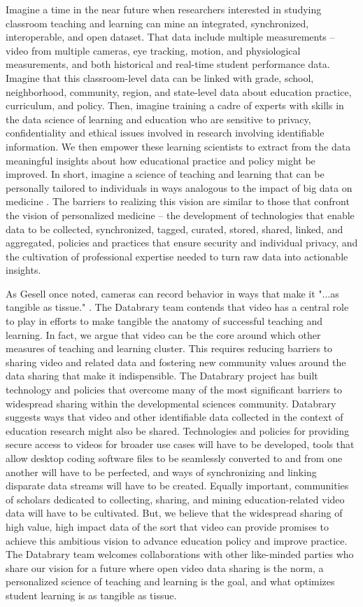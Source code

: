 \documentclass[letterpaper,man,apacite]{apa6}
\begin{document}
Imagine a time in the near future when researchers interested in studying classroom teaching and learning can mine an integrated, synchronized, interoperable, and open dataset.
That data include multiple measurements -- video from multiple cameras, eye tracking, motion, and physiological measurements, and both historical and real-time student performance data.
Imagine that this classroom-level data can be linked with grade, school, neighborhood, community, region, and state-level data about education practice, curriculum, and policy.
Then, imagine training a cadre of experts with skills in the data science of learning and education who are sensitive to privacy, confidentiality and ethical issues involved in research involving identifiable information.
We then empower these learning scientists to extract from the data meaningful insights about how educational practice and policy might be improved.
In short, imagine a science of teaching and learning that can be personally tailored to individuals in ways analogous to the impact of big data on medicine \cite{BBC2014}.
The barriers to realizing this vision are similar to those that confront the vision of personalized medicine -- the development of technologies that enable data to be collected, synchronized, tagged, curated, stored, shared, linked, and aggregated, policies and practices that ensure security and individual privacy, and the cultivation of professional expertise needed to turn raw data into actionable insights.

As Gesell once noted, cameras can record behavior in ways that make it "...as tangible as tissue." \cite{Scott2011}.
The Databrary team contends that video has a central role to play in efforts to make tangible the anatomy of successful teaching and learning.
In fact, we argue that video can be the core around which other measures of teaching and learning cluster.
This requires reducing barriers to sharing video and related data and fostering new community values around the  data sharing that make it indispensible.
The Databrary project has built technology and policies that overcome many of the most significant barriers to widespread sharing within the developmental sciences community. 
Databrary suggests ways that video and other identifiable data collected in the context of education research might also be shared.
Technologies and policies for providing secure access to videos for broader use cases will have to be developed,  tools that allow desktop coding software files to be seamlessly converted to and from one another will have to be perfected, and ways of synchronizing and linking disparate data streams will have to be created.
Equally important, communities of scholars dedicated to collecting, sharing, and mining education-related video data will have to be cultivated.
But, we believe that the widespread sharing of high value, high impact data of the sort that video can provide promises to achieve this ambitious vision to advance education policy and improve practice.
The Databrary team welcomes collaborations with other like-minded parties who share our vision \cite{Adolph2012} for a future where open video data sharing is the norm, a personalized science of teaching and learning is the goal, and what optimizes student learning is as tangible as tissue.


\end{document}
